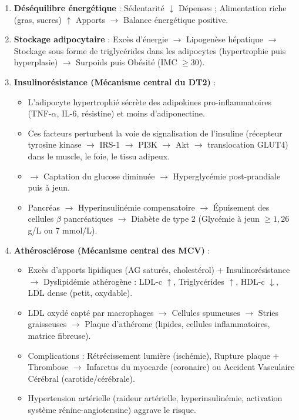 \documentclass[11pt]{article}
\newcommand{\cle}[1]{{\popxbold\color{popdark}#1}}
\begin{document}
\begin{propriete}
\begin{enumerate}
\item \textbf{Déséquilibre énergétique} : Sédentarité $\downarrow$ Dépenses ; Alimentation riche (gras, sucres) $\uparrow$ Apports $\rightarrow$ \cle{Balance énergétique positive}.
\item \textbf{Stockage adipocytaire} : Excès d'énergie $\rightarrow$ Lipogenèse hépatique $\rightarrow$ Stockage sous forme de \cle{triglycérides} dans les \cle{adipocytes} (hypertrophie puis hyperplasie) $\rightarrow$ \cle{Surpoids} puis \cle{Obésité} (IMC $\geq 30$).
\item \textbf{Insulinorésistance (Mécanisme central du DT2)} :
\begin{itemize}
\item L'adipocyte hypertrophié sécrète des \cle{adipokines pro-inflammatoires} (TNF-$\alpha$, IL-6, résistine) et moins d'adiponectine.
\item Ces facteurs perturbent la \cle{voie de signalisation de l'insuline} (récepteur tyrosine kinase $\rightarrow$ IRS-1 $\rightarrow$ PI3K $\rightarrow$ Akt $\rightarrow$ translocation \cle{GLUT4}) dans le muscle, le foie, le tissu adipeux.
\item $\rightarrow$ \cle{Captation du glucose} diminuée $\rightarrow$ \cle{Hyperglycémie} post-prandiale puis à jeun.
\item Pancréas $\rightarrow$ \cle{Hyperinsulinémie} compensatoire $\rightarrow$ Épuisement des \cle{cellules $\beta$ pancréatiques} $\rightarrow$ \cle{Diabète de type 2} (Glycémie à jeun $\geq 1,26$ g/L ou 7 mmol/L).
\end{itemize}
\item \textbf{Athérosclérose (Mécanisme central des MCV)} :
\begin{itemize}
\item Excès d'apports lipidiques (AG saturés, cholestérol) + Insulinorésistance $\rightarrow$ \cle{Dyslipidémie athérogène} : LDL-c $\uparrow$, Triglycérides $\uparrow$, HDL-c $\downarrow$, LDL dense (petit, oxydable).
\item \cle{LDL oxydé} capté par macrophages $\rightarrow$ \cle{Cellules spumeuses} $\rightarrow$ \cle{Stries graisseuses} $\rightarrow$ \cle{Plaque d'athérome} (lipides, cellules inflammatoires, matrice fibreuse).
\item \cle{Complications} : Rétrécissement lumière (ischémie), Rupture plaque + Thrombose $\rightarrow$ \cle{Infarctus du myocarde} (coronaire) ou \cle{Accident Vasculaire Cérébral} (carotide/cérébrale).
\item Hypertension artérielle (raideur artérielle, hyperinsulinémie, activation système rénine-angiotensine) aggrave le risque.
\end{itemize}
\end{enumerate}
\end{propriete}
\end{document}

